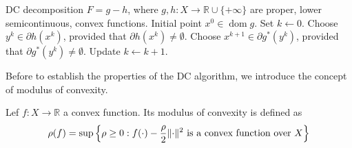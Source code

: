 \begin{algorithm}[ht]
\caption{DC Algorithm (DCA) in Hilbert spaces}
\label{alg:dca}
\begin{algorithmic}[1]
\Require DC decomposition $F = g - h$, where $g,h : X \to \mathbb{R}\cup\{+\infty\}$ are proper, lower semicontinuous, convex functions.
\Require Initial point $x^0 \in \operatorname{dom} g$.
\State Set $k \gets 0$.
    \State
    Choose $y^k \in \partial h(x^k)$, provided that $\partial h(x^k)\neq \emptyset$.
    \State 
    Choose $x^{k+1} \in \partial g^*(y^k)$, provided that $\partial g^*(y^k)\neq \emptyset$.
    \State Update $k \gets k+1$.
\EndWhile
\end{algorithmic}
\end{algorithm}
Before to establish the properties of the DC algorithm, we introduce the concept of modulus of convexity. 
\begin{definition}\label{def:modulus_convexity}
    Lef $f:X\to \mathbb{R}$ a convex function. Its modulus of convexity is defined as
    \[
    \rho(f)=\sup \left\{\rho\ge 0: f(\cdot)-\frac{\rho}{2}\lVert \cdot \rVert^2 \mbox{ is a convex function over }X \right\}
    \]
\end{definition}

